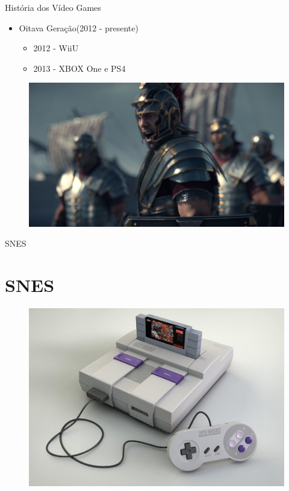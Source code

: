 \documentclass[xcolor=svgnames,handout]{beamer}
\begin{document}
\begin{frame}{História dos Vídeo Games}
\begin{itemize}

	\item Oitava Geração(2012 - presente)\pause
	\begin{itemize}
		\item 2012 - WiiU\pause
		\item 2013 - XBOX One e PS4
	\end{itemize}
\end{itemize}
				\begin{figure}[t]
			    \centering
				    \includegraphics[scale=0.07]{imagens/ryse}
				\end{figure}
\end{frame}
	
\begin{frame}{SNES}
\section{SNES}

\begin{figure}[t]
    \centering
    \includegraphics[scale=0.2]{imagens/snes}
\end{figure}
\end{frame}
\end{document}
